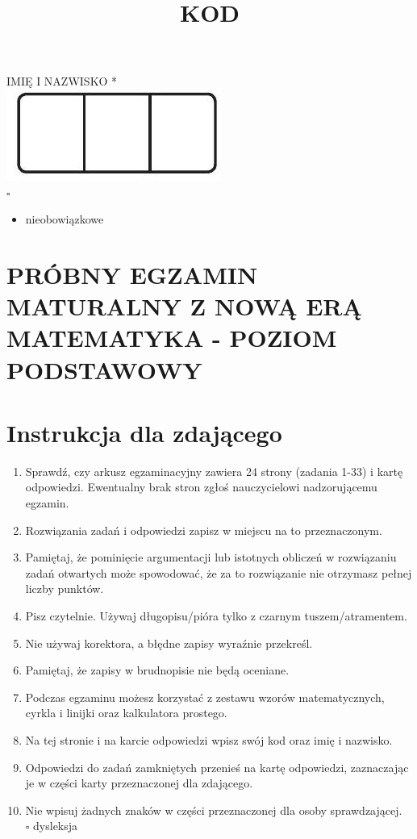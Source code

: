 \documentclass[10pt]{article}
\title{KOD }
\author{}
\date{}
\begin{document}
\maketitle
IMIĘ I NAZWISKO *\\
\includegraphics[max width=\textwidth, center]{2024_11_21_72158d4a4efa7dd894bcg-01}\\
\(\square\)

\begin{itemize}
  \item nieobowiązkowe
\end{itemize}

\section*{PRÓBNY EGZAMIN MATURALNY Z NOWĄ ERĄ MATEMATYKA - POZIOM PODSTAWOWY}
\section*{Instrukcja dla zdającego}
\begin{enumerate}
  \item Sprawdź, czy arkusz egzaminacyjny zawiera 24 strony (zadania 1-33) i kartę odpowiedzi. Ewentualny brak stron zgłoś nauczycielowi nadzorującemu egzamin.
  \item Rozwiązania zadań i odpowiedzi zapisz w miejscu na to przeznaczonym.
  \item Pamiętaj, że pominięcie argumentacji lub istotnych obliczeń w rozwiązaniu zadań otwartych może spowodować, że za to rozwiązanie nie otrzymasz pełnej liczby punktów.
  \item Pisz czytelnie. Używaj długopisu/pióra tylko z czarnym tuszem/atramentem.
  \item Nie używaj korektora, a błędne zapisy wyraźnie przekreśl.
  \item Pamiętaj, że zapisy w brudnopisie nie będą oceniane.
  \item Podczas egzaminu możesz korzystać z zestawu wzorów matematycznych, cyrkla i linijki oraz kalkulatora prostego.
  \item Na tej stronie i na karcie odpowiedzi wpisz swój kod oraz imię i nazwisko.
  \item Odpowiedzi do zadań zamkniętych przenieś na kartę odpowiedzi, zaznaczając je w części karty przeznaczonej dla zdającego.
  \item Nie wpisuj żadnych znaków w części przeznaczonej dla osoby sprawdzającej.\\
\(\square\) dysleksja
\end{enumerate}
\end{document}
